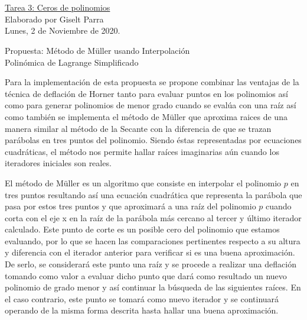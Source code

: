 \documentclass[11pt]{article}
\begin{document}
\begin{center}
 \Large \underline {\\ \\Tarea 3: Ceros de polinomios} \\ \medskip
 \small  {Elaborado por Giselt Parra}\\ 
 \footnotesize{Lunes, 2 de Noviembre de 2020.}
\end{center}


\vspace{0.75cm}
\begin{center} \large  {Propuesta: Método de Müller usando Interpolación \\Polinómica de Lagrange Simplificado} \end{center}

\vspace{0.5cm}
Para la implementación de esta propuesta se propone combinar las ventajas de la técnica de deflación de Horner tanto para evaluar puntos en los polinomios así como para generar polinomios de menor grado cuando se evalúa con una raíz así como también se implementa el método de Müller que aproxima raices de una manera similar al método de la Secante con la diferencia de que se trazan parábolas en tres puntos del polinomio. Siendo éstas representadas por ecuaciones cuadráticas, el método nos permite hallar raíces imaginarias aún cuando los iteradores iniciales son reales.


El método de Müller es un algoritmo que consiste en interpolar el polinomio $p$ en tres puntos resultando así una ecuación cuadrática que representa la parábola que pasa por estos tres puntos y que aproximará a una raíz del polinomio $p$ cuando corta con el eje x en la raíz de la parábola más cercano al tercer y último iterador calculado. Este punto de corte es un posible cero del polinomio que estamos evaluando, por lo que se hacen las comparaciones pertinentes respecto a su altura y diferencia con el iterador anterior para verificar si es una buena aproximación. De serlo, se considerará este punto una raíz y se procede a realizar una deflación tomando como valor a evaluar dicho punto que dará como resultado un nuevo polinomio de grado menor y así continuar la búsqueda de las siguientes raíces. En el caso contrario, este punto se tomará como nuevo iterador y se continuará operando de la misma forma descrita hasta hallar una buena aproximación.
\end{document}
